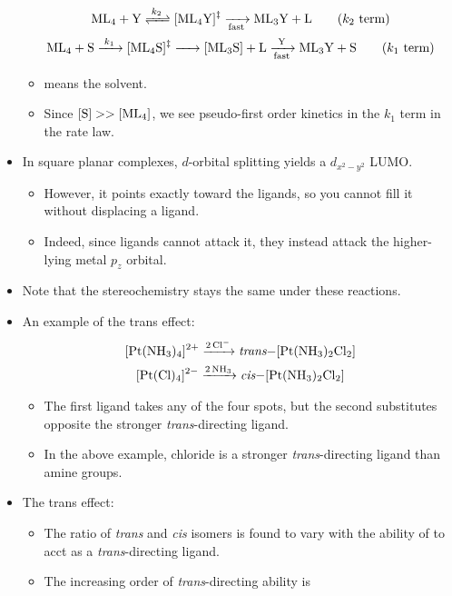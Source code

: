 \documentclass[../notes.tex]{subfiles}
\begin{document}
\begin{itemize}
    \begin{gather*}
        \ce{ML4 + Y <=>[$k_2$] [ML4Y]^{$\ddagger$} ->[][fast] ML3Y + L}\tag{$k_2$ term}\\
        \ce{ML4 + S ->[$k_1$] [ML4S]^{$\ddagger$} -> [ML3S] + L ->[Y][fast] ML3Y + S}\tag{$k_1$ term}
    \end{gather*}
    \begin{itemize}
        \item {} means the solvent.
        \item Since $\ce{[S]}>>\ce{[ML4]}$, we see pseudo-first order kinetics in the $k_1$ term in the rate law.
    \end{itemize}
    \item In square planar complexes, $d$-orbital splitting yields a $d_{x^2-y^2}$ LUMO.
    \begin{itemize}
        \item However, it points exactly toward the ligands, so you cannot fill it without displacing a ligand.
        \item Indeed, since ligands cannot attack it, they instead attack the higher-lying metal $p_z$ orbital.
    \end{itemize}
    \item Note that the stereochemistry stays the same under these reactions.
    \item An example of the trans effect:
    \begin{gather*}
        \ce{[Pt(NH3)4]^2+ ->[2Cl-] \emph{trans}-[Pt(NH3)2Cl2]}\\
        \ce{[Pt(Cl)4]^2- ->[2NH3] \emph{cis}-[Pt(NH3)2Cl2]}
    \end{gather*}
    \begin{itemize}
        \item The first ligand takes any of the four spots, but the second substitutes opposite the stronger \emph{trans}-directing ligand.
        \item In the above example, chloride is a stronger \emph{trans}-directing ligand than amine groups.
    \end{itemize}
    \item The trans effect:
    \begin{itemize}
        \item The ratio of \emph{trans} and \emph{cis} isomers is found to vary with the ability of  to acct as a \emph{trans}-directing ligand.
        \item The increasing order of \emph{trans}-directing ability is

\end{itemize}
\end{itemize}
\end{document}
